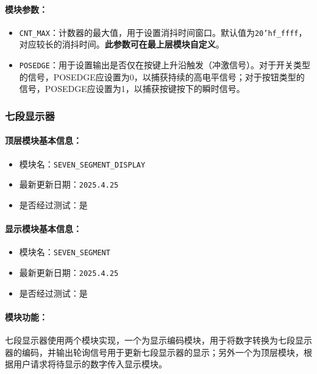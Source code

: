 \documentclass[lang=cn,a4paper,newtx]{elegantpaper}
\begin{document}
\paragraph{模块参数：}
\begin{itemize}
  \item \texttt{CNT\_MAX}：计数器的最大值，用于设置消抖时间窗口。默认值为\texttt{20'hf\_ffff}，对应较长的消抖时间。\textbf{此参数可在最上层模块自定义}。
  \item \texttt{POSEDGE}：用于设置输出是否仅在按键上升沿触发（冲激信号）。对于开关类型的信号，POSEDGE应设置为0，以捕获持续的高电平信号；对于按钮类型的信号，POSEDGE应设置为1，以捕获按键按下的瞬时信号。
\end{itemize}

\subsubsection{七段显示器}
\paragraph{顶层模块基本信息：}
\begin{itemize}
  \item 模块名：\texttt{SEVEN\_SEGMENT\_DISPLAY}
  \item 最新更新日期：\texttt{2025.4.25}
  \item 是否经过测试：是
\end{itemize}

\paragraph{显示模块基本信息：}
\begin{itemize}
  \item 模块名：\texttt{SEVEN\_SEGMENT}
  \item 最新更新日期：\texttt{2025.4.25}
  \item 是否经过测试：是
\end{itemize}

\paragraph{模块功能：}
七段显示器使用两个模块实现，一个为显示编码模块，用于将数字转换为七段显示器的编码，并输出轮询信号用于更新七段显示器的显示；另外一个为顶层模块，根据用户请求将待显示的数字传入显示模块。
\end{document}
